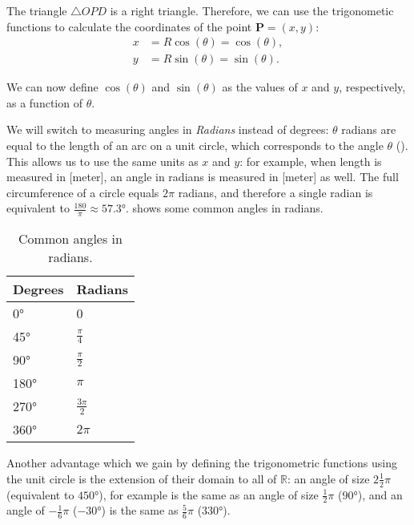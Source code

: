 The triangle $\triangle OPD$ is a right triangle. Therefore, we can use the trigonometic functions to calculate the coordinates of the point $\bm{P}=(x,y)$:
\begin{align}
	x &= R\cos(\theta) = \cos(\theta),\nonumber\\
	y &= R\sin(\theta) = \sin(\theta).
	\label{eq:xy_P}
\end{align}

We can now define $\cos(\theta)$ and $\sin(\theta)$ as the values of $x$ and $y$, respectively, as a function of $\theta$.

We will switch to measuring angles in \emph{Radians} instead of degrees: $\theta$ radians are equal to the length of an arc on a unit circle, which corresponds to the angle $\theta$ (). This allows us to use the same units as $x$ and $y$: for example, when length is measured in [\si{meter}], an angle in radians is measured in [\si{meter}] as well. The full circumference of a circle equals $2\pi$ radians, and therefore a single radian is equivalent to $\frac{180}{\pi} \approx \ang{57.3}$.  shows some common angles in radians.

\begin{table}
	\caption{Common angles in radians.}
	\label{tab:rad_degs}
	\centering
	\begin{tabular}{ll}
		\toprule
		Degrees & Radians \\
		\midrule
		\ang{0} & 0 \\
		\ang{45} & $\frac{\pi}{4}$ \\
		\ang{90} & $\frac{\pi}{2}$ \\
		\ang{180} & $\pi$ \\
		\ang{270} & $\frac{3\pi}{2}$ \\
		\ang{360} & $2\pi$ \\
		\bottomrule
	\end{tabular}
\end{table}

Another advantage which we gain by defining the trigonometric functions using the unit circle is the extension of their domain to all of $\mathbb{R}$: an angle of size $2\frac{1}{2}\pi$ (equivalent to $\ang{450}$), for example is the same as an angle of size $\frac{1}{2}\pi$ ($\ang{90}$), and an angle of $-\frac{1}{6}\pi$ ($-\ang{30}$) is the same as $\frac{5}{6}\pi$ ($\ang{330}$).

